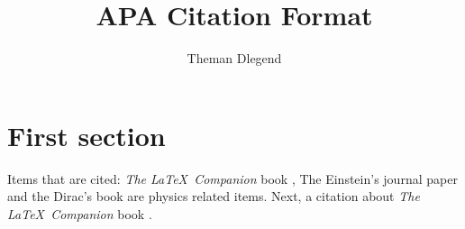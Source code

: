 \documentclass{article}
\title{APA Citation Format}
\author{Theman Dlegend}
\begin{document}
\maketitle
\section{First section}

\lipsum
Items that are cited: \textit{The \LaTeX\ Companion} book \cite{latexcompanion}, The Einstein's journal paper \cite{einstein} and the Dirac's book \cite{dirac} are physics related items. Next, a citation about \textit{The \LaTeX\ Companion} book \cite{latexcompanion}.

\medskip

\printbibliography
\end{document}
